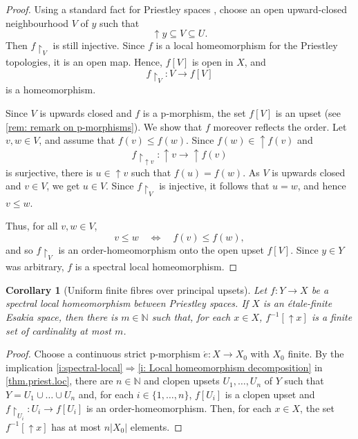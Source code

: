 \documentclass[12pt]{amsart}
\theoremstyle{plain}
\newtheorem{corollary}[theorem]{Corollary}
\theoremstyle{definition}
\newcommand{\N}{\mathbb{N}}
\renewcommand{\u}{{\uparrow}}
\begin{document}
\begin{proof}
    Using a standard fact for Priestley spaces \cite[Lem.~11.21]{Davey2002-lr}, choose an open upward-closed neighbourhood $V$ of
    $y$ such that
    \[
    {\u} y \subseteq V \subseteq U.
    \]
    Then $f{\restriction}_V$ is still injective. Since $f$ is a local homeomorphism for the Priestley topologies, it is an open map. Hence, $f[V]$ is open in $X$, and
    \[
    f{\restriction}_{V} \colon V \longrightarrow f[V]
    \]
    is a homeomorphism.
    
    Since $V$ is upwards closed and $f$ is a p-morphism, the set $f[V]$ is an upset (see \cref{rem: remark on p-morphisms}). We show that $f$ moreover reflects the order. Let $v,w\in V$, and assume that $f(v)\leq f(w)$. Since $f(w)\in {\u} f(v)$ and
    \[
    f{\restriction}_{{\u}v}\colon {\u} v \longrightarrow {\u} f(v)
    \]
    is surjective, there is $u\in {\u} v$ such that $f(u)=f(w)$. As $V$ is upwards closed and
    $v\in V$, we get $u\in V$. Since $f{\restriction}_{V}$ is injective, it follows that $u=w$,
    and hence $v\leq w$.
    
    Thus, for all $v,w\in V$,
    \[
    v\leq w \quad\Longleftrightarrow\quad f(v)\leq f(w),
    \]
    and so $f{\restriction}_V$ is an order-homeomorphism onto the open upset $f[V]$.
    Since $y\in Y$ was arbitrary, $f$ is a spectral local homeomorphism.
\end{proof}



\begin{corollary}[Uniform finite fibres over principal upsets]\label{cor:finiteness}
    Let $f \colon Y\to X$ be a spectral local homeomorphism between Priestley spaces.
    If $X$ is an étale-finite Esakia space, then there is $m \in \N$ such that, for each $x\in X$, $f^{-1}[{\u}x]$ is a finite set of cardinality at most $m$.
\end{corollary}

\begin{proof}
    Choose a continuous strict p-morphism $\acute e\colon X\to X_0$ with $X_0$ finite.
    By the implication \eqref{i:spectral-local}$\Rightarrow$\eqref{i: Local homeomorphism decomposition} in \cref{thm.priest.loc}, there are $n \in \N$ and clopen upsets $U_{1},\dots,U_{n}$ of $Y$ such that $Y=U_{1}\cup\dots\cup U_{n}$ and, for each $i \in \{1, \dots, n\}$, $f[U_i]$ is a clopen upset and $f {\restriction}_{U_i} \colon U_i \to f[U_i]$ is an order-homeomorphism.
    Then, for each $x \in X$, the set $f^{-1}[{\u}x]$ has at most $n \lvert X_{0} \rvert$ elements.
\end{proof}
\end{document}
